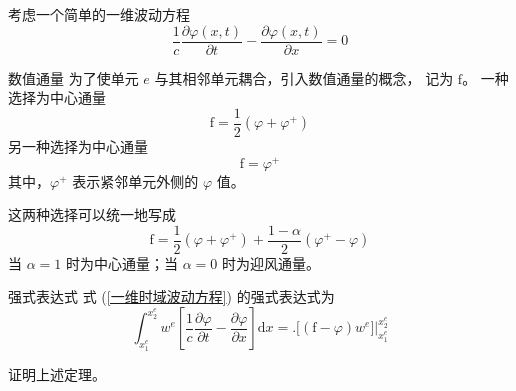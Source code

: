 \par 考虑一个简单的一维波动方程
\begin{equation}
    \frac{1}{c}\frac{\partial \varphi(x,t)}{\partial t}
    -\frac{\partial \varphi(x,t)}{\partial x}=0
    \label{一维时域波动方程}
\end{equation}

\begin{definition}{数值通量}
    为了使单元 $e$ 与其相邻单元耦合，引入数值通量的概念，
    记为 $\text{f}$。
    一种选择为中心通量
    \begin{equation}
        \text{f}=\frac{1}{2}(\varphi+\varphi^+)
    \end{equation}
    另一种选择为中心通量
    \begin{equation}
        \text{f}=\varphi^+
    \end{equation}
    其中，$\varphi^+$ 表示紧邻单元外侧的 $\varphi$ 值。

    这两种选择可以统一地写成
    \begin{equation}
        \text{f}=\frac{1}{2}(\varphi+\varphi^+)
        +\frac{1-\alpha}{2}(\varphi^+-\varphi)
    \end{equation}
    当 $\alpha=1$ 时为中心通量；当 $\alpha=0$ 时为迎风通量。
\end{definition}

\begin{theorem}{强式表达式}
    式 (\ref{一维时域波动方程}) 的强式表达式为
    \begin{equation}
        \int_{x_1^e}^{x_2^e}w^e\left[
            \frac{1}{c}\frac{\partial \varphi}{\partial t}
            -\frac{\partial \varphi}{\partial x}
        \right]\text{d}x
        =\Big.\big[(\text{f}-\varphi) w^e\big]\Big|_{x_1^e}^{x_2^e}
    \end{equation}
\end{theorem}

\begin{exercise}
    证明上述定理。
\end{exercise}

